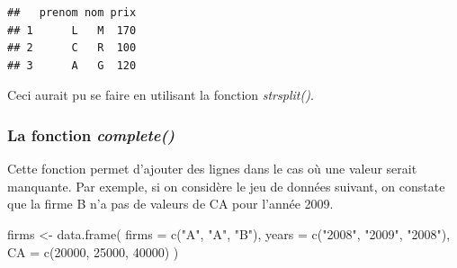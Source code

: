 \documentclass[
]{book}
\newenvironment{Shaded}{\begin{snugshade}}{\end{snugshade}}
\newcommand{\AttributeTok}[1]{\textcolor[rgb]{0.77,0.63,0.00}{#1}}
\newcommand{\DecValTok}[1]{\textcolor[rgb]{0.00,0.00,0.81}{#1}}
\newcommand{\FunctionTok}[1]{\textcolor[rgb]{0.00,0.00,0.00}{#1}}
\newcommand{\NormalTok}[1]{#1}
\newcommand{\OtherTok}[1]{\textcolor[rgb]{0.56,0.35,0.01}{#1}}
\newcommand{\StringTok}[1]{\textcolor[rgb]{0.31,0.60,0.02}{#1}}
\theoremstyle{definition}
\theoremstyle{definition}
\theoremstyle{definition}
\theoremstyle{definition}
\theoremstyle{remark}
\begin{document}
\begin{Shaded}
\end{Shaded}

\begin{verbatim}
##   prenom nom prix
## 1      L   M  170
## 2      C   R  100
## 3      A   G  120
\end{verbatim}

Ceci aurait pu se faire en utilisant la fonction \emph{strsplit()}.

\hypertarget{la-fonction-complete}{%
\subsubsection{\texorpdfstring{La fonction \emph{complete()}}{La fonction complete()}}\label{la-fonction-complete}}

Cette fonction permet d'ajouter des lignes dans le cas où une valeur serait manquante. Par exemple, si on considère le jeu de données suivant, on constate que la firme B n'a pas de valeurs de CA pour l'année 2009.

\begin{Shaded}
\begin{Highlighting}[]
\NormalTok{firms }\OtherTok{\textless{}{-}} \FunctionTok{data.frame}\NormalTok{(}
  \AttributeTok{firms =} \FunctionTok{c}\NormalTok{(}\StringTok{"A"}\NormalTok{, }\StringTok{"A"}\NormalTok{, }\StringTok{"B"}\NormalTok{),}
  \AttributeTok{years =} \FunctionTok{c}\NormalTok{(}\StringTok{"2008"}\NormalTok{, }\StringTok{"2009"}\NormalTok{, }\StringTok{"2008"}\NormalTok{),}
  \AttributeTok{CA =} \FunctionTok{c}\NormalTok{(}\DecValTok{20000}\NormalTok{, }\DecValTok{25000}\NormalTok{, }\DecValTok{40000}\NormalTok{)}
\NormalTok{)}
\end{Highlighting}
\end{Shaded}
\end{document}
